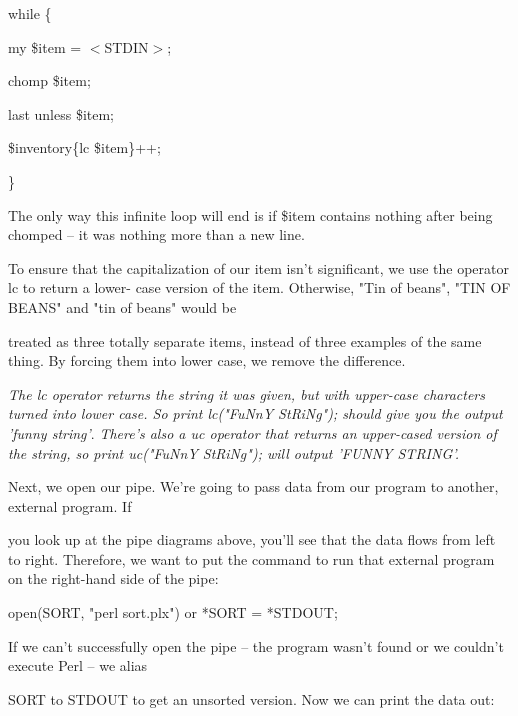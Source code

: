 \documentclass[a4paper,11pt]{book}
\begin{document}
\noindent 

\noindent while \{

\noindent my \$item = $<$STDIN$>$;

\noindent chomp \$item;

\noindent last unless \$item;

\noindent \$inventory\{lc \$item\}++;

\noindent \}

\noindent 

\noindent The only way this infinite loop will end is if \$item contains nothing after being chomped -- it was nothing more than a new line.

\noindent 

\noindent To ensure that the capitalization of our item isn't significant, we use the operator lc to return a lower- case version of the item. Otherwise, "Tin of beans", "TIN OF BEANS" and "tin of beans" would be

\noindent treated as three totally separate items, instead of three examples of the same thing. By forcing them into lower case, we remove the difference.

\noindent 

\noindent \textit{The lc operator returns the string it was given, but with upper-case characters turned into lower case. So print lc("FuNnY StRiNg"); should give you the output 'funny string'}. \textit{There's also a uc operator that returns an upper-cased version of the string, so print uc("FuNnY StRiNg"); will output   'FUNNY STRING'.}

\noindent 

\noindent 

\noindent Next, we open our pipe. We're going to pass data from our program to another, external program. If

\noindent you look up at the pipe diagrams above, you'll see that the data flows from left to right. Therefore, we want to put the command to run that external program on the right-hand side of the pipe:

\noindent 

\noindent 

\noindent open(SORT, "\textbar  perl sort.plx") or *SORT = *STDOUT;

\noindent 

\noindent If we can't successfully open the pipe -- the program wasn't found or we couldn't execute Perl -- we alias

\noindent SORT to STDOUT to get an unsorted version. Now we can print the data out:
\end{document}
